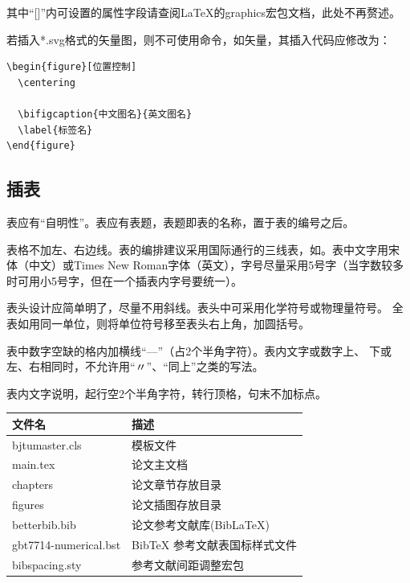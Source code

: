 \noindent 其中“[]”内可设置的属性字段请查阅\LaTeX{}的graphics宏包文档\cite{CP2024Packagesgraphi}，此处不再赘述。

若插入*.svg格式的矢量图，则不可使用命令，如矢量，其插入代码应修改为：

\begin{figure}[H]
  \centering
  
  \label{猪肉刺身杯}
\end{figure}

\begin{lstlisting}[language={[LaTeX]TeX}]
\begin{figure}[位置控制]
  \centering
  
  \bifigcaption{中文图名}{英文图名}
  \label{标签名}
\end{figure}
\end{lstlisting}

\subsection{插表}
表应有“自明性”。表应有表题，表题即表的名称，置于表的编号之后。

表格不加左、右边线。表的编排建议采用国际通行的三线表，如。表中文字用宋
体（中文）或Times New Roman字体（英文），字号尽量采用5号字（当字数较多
时可用小5号字，但在一个插表内字号要统一）。 

表头设计应简单明了，尽量不用斜线。表头中可采用化学符号或物理量符号。 
全表如用同一单位，则将单位符号移至表头右上角，加圆括号。

表中数字空缺的格内加横线“—”（占2个半角字符）。表内文字或数字上、
下或左、右相同时，不允许用“〃”、“同上”之类的写法。 

表内文字说明，起行空2个半角字符，转行顶格，句末不加标点。

\begin{table}[H]\wuhao
  \centering
  \renewcommand\arraystretch{1.0} %
  \begin{tabular}{ll}
    \toprule
    文件名          & 描述                         \\
    \midrule
    bjtumaster.cls   & 模板文件                     \\
    main.tex & 论文主文档    \\
    chapters & 论文章节存放目录  \\
    figures & 论文插图存放目录        \\
    betterbib.bib & 论文参考文献库(BibLaTeX)        \\
    gbt7714-numerical.bst & BibTeX 参考文献表国标样式文件    \\
    bibspacing.sty & 参考文献间距调整宏包  \\
    \bottomrule
  \end{tabular}
  \label{tab:eg1}
\end{table}

